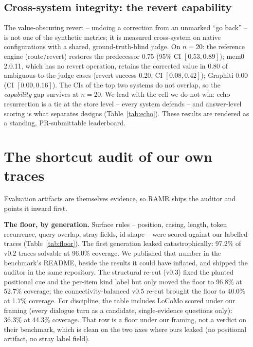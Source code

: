 \documentclass[11pt]{article}
\begin{document}
\subsection{Cross-system integrity: the revert capability}
\label{sec:crosssystem}

The value-obscuring revert -- undoing a correction from an unmarked ``go back'' -- is not one of the
synthetic metrics; it is measured cross-system on native configurations with a shared, ground-truth-blind
judge. On $n{=}20$: the reference engine (route/revert) restores the predecessor 0.75 (95\% CI
$[0.53,0.89]$); mem0 2.0.11, which has no revert operation, retains the corrected value in 0.80 of
ambiguous-to-the-judge cases (revert success 0.20, CI $[0.08,0.42]$); Graphiti 0.00 (CI $[0.00,0.16]$).
The CIs of the top two systems do not overlap, so the \emph{capability} gap survives at $n{=}20$. We
lead with the cell we do not win: echo resurrection is a tie at the store level -- every system
defends -- and answer-level scoring is what separates designs (Table~\ref{tab:echo}). These results are
rendered as a standing, PR-submittable leaderboard.

\section{The shortcut audit of our own traces}
\label{sec:audit}

Evaluation artifacts are themselves evidence, so RAMR ships the auditor and points it inward first.

\textbf{The floor, by generation.} Surface rules -- position, casing, length, token recurrence, query
overlap, stray fields, id shape -- were scored against our labelled traces (Table~\ref{tab:floor}).
The first generation leaked catastrophically: 97.2\% of v0.2 traces solvable at 96.0\% coverage. We
published that number in the benchmark's README, beside the results it could have inflated, and shipped
the auditor in the same repository. The structural re-cut (v0.3) fixed the planted positional cue and
the per-item kind label but only moved the floor to 96.8\% at 52.7\% coverage; the
connectivity-balanced v0.5 re-cut brought the floor to 40.0\% at 1.7\% coverage. For discipline, the
table includes LoCoMo scored under our framing (every dialogue turn as a candidate, single-evidence
questions only): 36.3\% at 44.3\% coverage. That row is a floor under our framing, not a verdict on
their benchmark, which is clean on the two axes where ours leaked (no positional artifact, no stray
label field).
\end{document}
